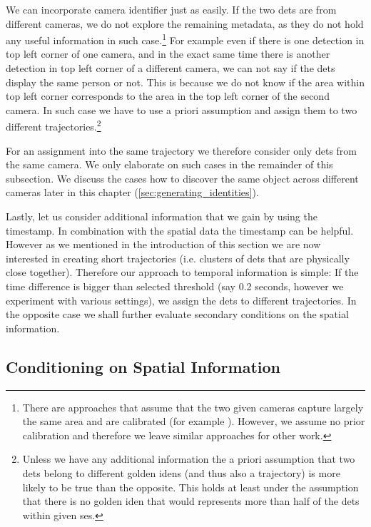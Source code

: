 We can incorporate camera identifier just as easily. If the two
\glspl{det} are from different cameras, we do not explore the remaining
metadata, as they do not hold any useful information in such
case.\footnote{There
are approaches that assume that the two given cameras capture largely the same
area and are calibrated (for example \cite{hu2006principal}). However, we
assume no prior calibration and therefore we leave similar approaches for other
work.} For example even if there is one detection in top left corner of one
camera, and in the exact same time there is another detection in top left corner
of a different camera, we can not say if the \glspl{det}
display the same person or not. This is
because we do not know if the area within top left corner corresponds to the
area in the top left corner of the second camera. In such case we have to use
a priori assumption and assign them to two different
trajectories.\footnote{Unless we have any additional information the a priori
assumption that two \glspl{det} belong to different golden \glspl{iden} (and thus also a trajectory) is more
likely to be true than the opposite. This holds at least under the assumption that there is no
golden \gls{iden} that would represents more than half of the
\glspl{det} within given \gls{ses}.}

For an assignment into the same trajectory we therefore consider only \glspl{det}
from the same camera. We only elaborate on such cases in the remainder
of this subsection. We discuss the cases how to discover the same object across
different cameras later in this chapter (\autoref{sec:generating_identities}).

Lastly, let us consider additional information that we gain by using the timestamp.
In combination with the spatial data the timestamp can be helpful. However as
we mentioned in the introduction of this section
we are now interested in creating short trajectories (i.e. clusters of
\glspl{det} that are physically close together). Therefore
our approach to temporal information is simple: If the time difference is
bigger than selected threshold (say 0.2 seconds, however we experiment with
various settings), we assign the \glspl{det} to different trajectories. In the
opposite case we shall further evaluate secondary conditions on the spatial
information.

\subsection{Conditioning on Spatial Information}


